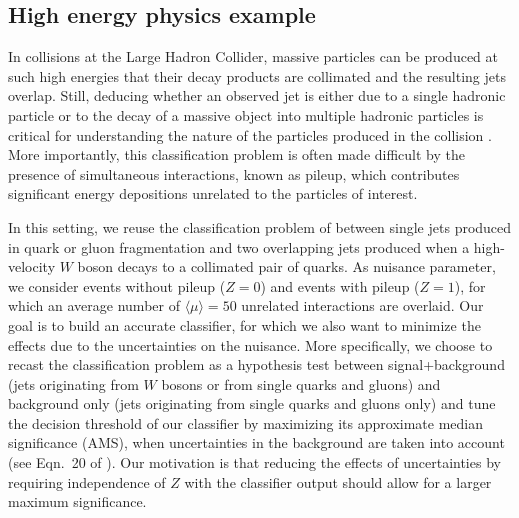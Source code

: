 \documentclass[twocolumn,superscriptaddress,aps]{revtex4-1}
\theoremstyle{plain}
\begin{document}
\subsection{High energy physics example}

In collisions at the Large Hadron Collider, massive particles can be produced at
such high energies that their decay products are collimated and the resulting
jets overlap. Still, deducing whether an observed jet is either due  to a single
hadronic particle or to the decay of a massive object into multiple hadronic
particles  is critical for understanding the nature of the particles produced in
the collision \citep{butterworth2008jet,guest2016jet}. More importantly, this
classification problem is often made difficult by the presence of simultaneous
interactions, known as pileup, which contributes significant energy depositions
unrelated to the particles of interest.

In this setting, we reuse the classification problem of \citep{guest2016jet}
between single jets produced in quark or gluon fragmentation and two overlapping
jets produced when a high-velocity $W$ boson decays to a collimated pair of
quarks. As nuisance parameter, we consider events without pileup ($Z=0$) and
events with pileup ($Z=1$), for which an average number of $\langle \mu \rangle =
50$ unrelated interactions are overlaid. Our goal is to build an accurate
classifier, for which we also want to minimize the effects due to the
uncertainties on the nuisance. More specifically, we choose to recast the
classification problem as a hypothesis test between signal+background (jets
originating from $W$ bosons or from single quarks and gluons) and background
only (jets originating from single quarks and gluons only) and tune the decision
threshold of our classifier by maximizing its approximate median significance
(AMS), when uncertainties in the background are taken into account (see Eqn.~20
of \citep{adam2014higgs}). Our motivation is that reducing the effects of
uncertainties by requiring independence of $Z$ with the classifier output should
allow for a larger maximum significance.
\end{document}
